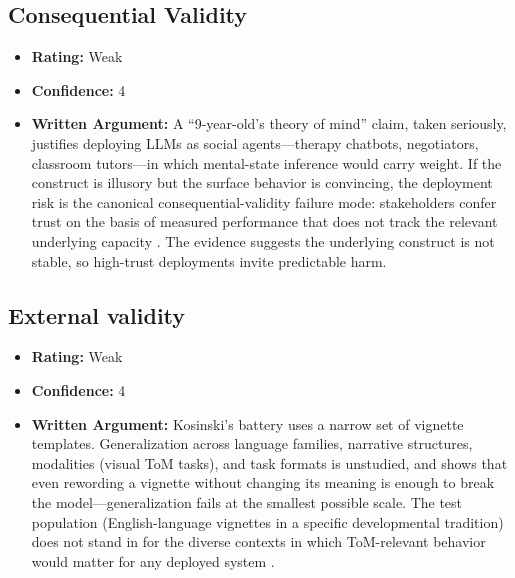\subsection{Consequential Validity}
\begin{itemize}
    \item \textbf{Rating:} Weak
    \item \textbf{Confidence:} 4
    \item \textbf{Written Argument:} A ``9-year-old's theory of mind'' claim, taken seriously, justifies deploying LLMs as social agents---therapy chatbots, negotiators, classroom tutors---in which mental-state inference would carry weight. If the construct is illusory but the surface behavior is convincing, the deployment risk is the canonical consequential-validity failure mode: stakeholders confer trust on the basis of measured performance that does not track the relevant underlying capacity \citep{salaudeen2025measurement}. The evidence \citep{ullman2023llm} suggests the underlying construct is not stable, so high-trust deployments invite predictable harm.
\end{itemize}

\subsection{External validity}
\begin{itemize}
    \item \textbf{Rating:} Weak
    \item \textbf{Confidence:} 4
    \item \textbf{Written Argument:} Kosinski's battery uses a narrow set of vignette templates. Generalization across language families, narrative structures, modalities (visual ToM tasks), and task formats is unstudied, and \citet{ullman2023llm} shows that even rewording a vignette without changing its meaning is enough to break the model---generalization fails at the smallest possible scale. The test population (English-language vignettes in a specific developmental tradition) does not stand in for the diverse contexts in which ToM-relevant behavior would matter for any deployed system \citep{salaudeen2025measurement}.
\end{itemize}

